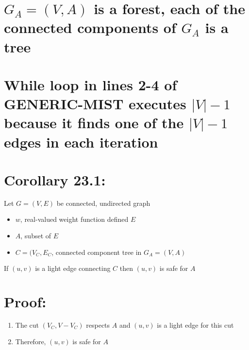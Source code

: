 \documentclass[a4paper, 10pt]{article}
\begin{document}
\section{$G_A =(V,A)$ is a forest, each of the connected components of $G_A$ is 
		a tree}
\section{While loop in lines 2-4 of GENERIC-MIST executes $|V|-1$ because it
		finds one of the $|V|-1$ edges in each iteration}
\section{Corollary 23.1:}
Let $G=(V,E)$ be connected, undirected graph 
\begin{itemize}
	\item $w$, real-valued weight function defined $E$
	\item $A$, subset of $E$
	\item $C=(V_C,E_C$, connected component tree in $G_A = (V,A)$
\end{itemize}
If $(u,v)$ is a light edge connecting $C$ then $(u,v)$ is safe for $A$
\section{Proof:}
\begin{enumerate}
	\item The cut $(V_C ,V-V_C )$ respects $A$ and $(u,v)$ is a light edge for
		this cut
	\item Therefore, $(u,v)$ is safe for $A$
\end{enumerate}		
\end{document}
